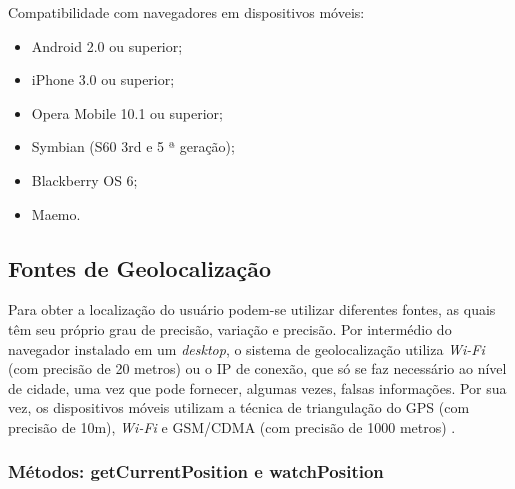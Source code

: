 Compatibilidade com navegadores em dispositivos móveis:
\begin{itemize}
    \item Android 2.0 ou superior;
    \item iPhone 3.0 ou superior;
    \item Opera Mobile 10.1 ou superior;
    \item Symbian (S60 3rd e 5 ª geração);
    \item Blackberry OS 6;
    \item Maemo.
\end{itemize}

\subsection{Fontes de Geolocalização}

Para obter a localização do usuário podem-se utilizar diferentes fontes, as quais têm seu próprio grau de precisão, variação e precisão. Por intermédio do navegador instalado em um \textit{desktop}, o sistema de geolocalização utiliza \textit{Wi-Fi} (com precisão de 20 metros) ou o IP de conexão, que só se faz necessário ao nível de cidade,  uma vez que pode fornecer, algumas vezes, falsas informações. Por sua vez, os dispositivos móveis utilizam a técnica de triangulação do GPS (com precisão de 10m), \textit{Wi-Fi} e GSM/CDMA (com precisão de 1000 metros) \cite{geolocalizacao:2011}.

\subsubsection{Métodos: getCurrentPosition e watchPosition}


